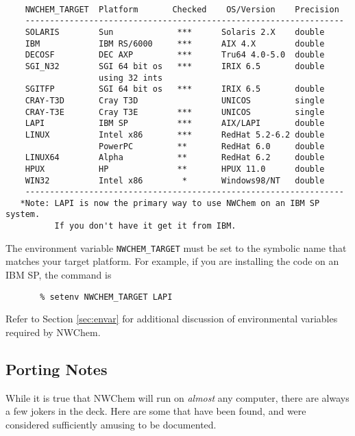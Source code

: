 \begin{verbatim}

    NWCHEM_TARGET  Platform       Checked    OS/Version    Precision
    -----------------------------------------------------------------
    SOLARIS        Sun             ***      Solaris 2.X    double
    IBM            IBM RS/6000     ***      AIX 4.X        double
    DECOSF         DEC AXP         ***      Tru64 4.0-5.0  double
    SGI_N32        SGI 64 bit os   ***      IRIX 6.5       double
                   using 32 ints
    SGITFP         SGI 64 bit os   ***      IRIX 6.5       double
    CRAY-T3D       Cray T3D                 UNICOS         single
    CRAY-T3E       Cray T3E        ***      UNICOS         single
    LAPI           IBM SP          ***      AIX/LAPI       double
    LINUX          Intel x86       ***      RedHat 5.2-6.2 double
                   PowerPC         **       RedHat 6.0     double
    LINUX64        Alpha           **       RedHat 6.2     double
    HPUX           HP              **       HPUX 11.0      double
    WIN32          Intel x86        *       Windows98/NT   double
    -----------------------------------------------------------------
   *Note: LAPI is now the primary way to use NWChem on an IBM SP system.
          If you don't have it get it from IBM. 

\end{verbatim}
The environment variable {\tt NWCHEM\_TARGET} must
be set to the symbolic name
that matches your target platform.  For example, if you are installing
the code on an IBM SP, the command is

\begin{verbatim}
       % setenv NWCHEM_TARGET LAPI
\end{verbatim}

Refer to Section \ref{sec:envar} for additional discussion of environmental variables
required by NWChem.

\subsection{Porting Notes}
\label{sec:PortingNotes}

While it is true that NWChem will run on {\em almost} any computer, there are always
a few jokers in the deck.  Here are some that have been found, and were
considered sufficiently amusing to be documented.

